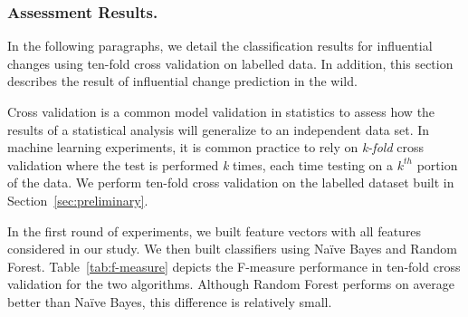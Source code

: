 \subsubsection{Assessment Results.}
In the following paragraphs, we detail the classification results for
influential changes using ten-fold cross validation on labelled
data. In addition, this section describes the result of influential
change prediction in the wild.


Cross validation is a common model validation in statistics to
assess how the results of a statistical analysis will generalize to an
independent data set. In machine learning experiments, it is common practice to
rely on {\em k-fold} cross validation where the test is performed {\em k} times,
each time testing on a $k^{th}$ portion of the data. We perform ten-fold cross
validation on the labelled dataset built in Section~\ref{sec:preliminary}.

In the first round of experiments, we built feature vectors with all
features considered in our study. We then built classifiers using Na\"{i}ve
Bayes and Random Forest. Table~\ref{tab:f-measure} depicts the F-measure
performance in ten-fold cross validation for the two algorithms. Although
Random Forest performs on average better than Na\"{i}ve Bayes, this difference
is relatively small.






